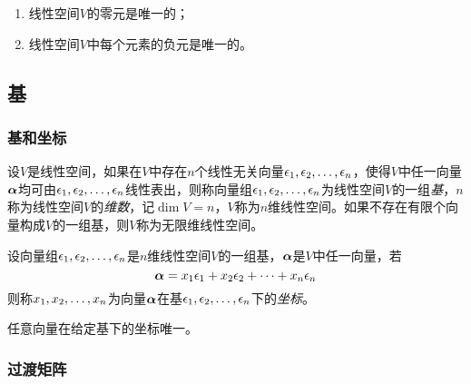 \documentclass{ctexart}
\begin{document}
\begin{property}
    \begin{enumerate}
        \item 线性空间\(V\)的零元是唯一的；
        \item 线性空间\(V\)中每个元素的负元是唯一的。
    \end{enumerate}
\end{property}

\subsection{基}

\subsubsection*{基和坐标}

\begin{definition}[基]
    设\(V\)是线性空间，如果在\(V\)中存在\(n\)个线性无关向量\({\epsilon}_1,{\epsilon}_2,\dots,{\epsilon}_{n}\)，使得\(V\)中任一向量\(\boldsymbol{\alpha}\)均可由\({\epsilon}_1,{\epsilon}_2,\dots,{\epsilon}_{n}\)线性表出，则称向量组\({\epsilon}_1,{\epsilon}_2,\dots,{\epsilon}_{n}\)为线性空间\(V\)的一组\emph{基}，\(n\)称为线性空间\(V\)的\emph{维数}，记\(\dim{V}=n\)，\(V\)称为\(n\)维线性空间。如果不存在有限个向量构成\(V\)的一组基，则\(V\)称为无限维线性空间。
\end{definition}

\begin{definition}[坐标]
    设向量组\({\epsilon}_1,{\epsilon}_2,\dots,{\epsilon}_{n}\)是\(n\)维线性空间\(V\)的一组基，\(\boldsymbol{\alpha}\)是\(V\)中任一向量，若
    \begin{equation*}
        \boldsymbol{\alpha}=x_1\epsilon_1+x_2\epsilon_2+\cdots+x_n\epsilon_n
    \end{equation*}
    则称\({x}_1,{x}_2,\dots,{x}_{n}\)为向量\(\boldsymbol{\alpha}\)在基\({\epsilon}_1,{\epsilon}_2,\dots,{\epsilon}_{n}\)下的\emph{坐标}。
\end{definition}

\begin{theorem}
    任意向量在给定基下的坐标唯一。
\end{theorem}

\subsubsection*{过渡矩阵}
\end{document}
